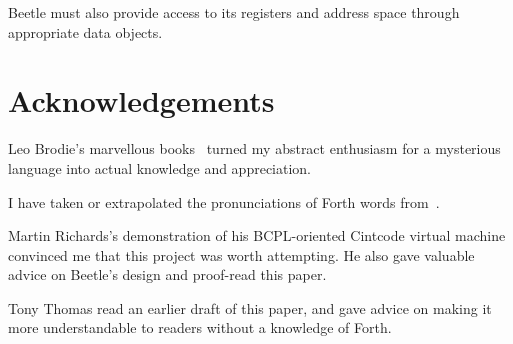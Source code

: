 \documentclass[english]{article}
\newlength{\pronunc}\pronunc=1.7in
\begin{document}
Beetle must also provide access to its registers and address space through
appropriate data objects.


\section*{Acknowledgements}

Leo Brodie's marvellous books~\cite{starting4th,thinking4th} turned my abstract
enthusiasm for a mysterious language into actual knowledge and appreciation.

I have taken or extrapolated the pronunciations of Forth words from~\cite{ANSIforth}.

Martin Richards's demonstration of his BCPL-oriented Cintcode virtual machine
convinced me that this project was worth attempting. He also gave valuable
advice on Beetle's design and proof-read this paper.

Tony Thomas read an earlier draft of this paper, and gave advice on making it
more understandable to readers without a knowledge of Forth.




\end{document}
